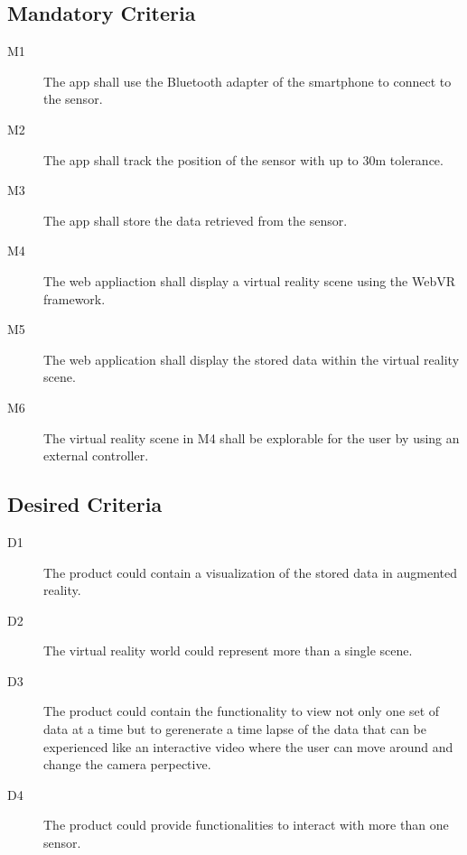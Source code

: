 \subsection{Mandatory Criteria}

\begin{description}
	\item[M1] The app shall use the Bluetooth adapter of the smartphone to connect to the sensor.
	\item[M2] The app shall track the position of the sensor with up to 30m tolerance.
	\item[M3] The app shall store the data retrieved from the sensor.
	\item[M4] The web appliaction shall display a virtual reality scene using the WebVR framework.
	\item[M5] The web application shall display the stored data within the virtual reality scene.
	\item[M6] The virtual reality scene in M4 shall be explorable for the user by using an external controller.
	
\end{description}

\subsection{Desired Criteria}

\begin{description}
  \item[D1] The product could contain a visualization of the stored data in augmented reality.
  \item[D2] The virtual reality world could represent more than a single scene.
  \item[D3] The product could contain the functionality to view not only one set of data at a time but to gerenerate a time lapse of the data that can be experienced like an interactive video where the user can move around and change the camera perpective.
  \item[D4] The product could provide functionalities to interact with more than one sensor.
\end{description}
